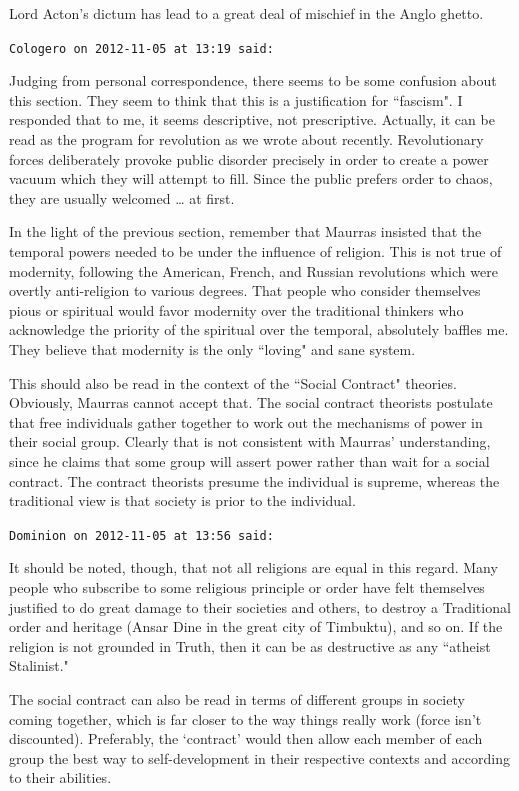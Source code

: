 \begin{footnotesize}
\begin{sffamily}
Lord Acton's dictum has lead to a great deal of mischief in the Anglo ghetto.


\hfill

\texttt{Cologero on 2012-11-05 at 13:19 said: }

Judging from personal correspondence, there seems to be some confusion about this section. They seem to think that this is a justification for ``fascism". I responded that to me, it seems descriptive, not prescriptive. Actually, it can be read as the program for revolution as we wrote about recently. Revolutionary forces deliberately provoke public disorder precisely in order to create a power vacuum which they will attempt to fill. Since the public prefers order to chaos, they are usually welcomed … at first.

In the light of the previous section, remember that Maurras insisted that the temporal powers needed to be under the influence of religion. This is not true of modernity, following the American, French, and Russian revolutions which were overtly anti-religion to various degrees. That people who consider themselves pious or spiritual would favor modernity over the traditional thinkers who acknowledge the priority of the spiritual over the temporal, absolutely baffles me. They believe that modernity is the only ``loving" and sane system.

This should also be read in the context of the ``Social Contract" theories. Obviously, Maurras cannot accept that. The social contract theorists postulate that free individuals gather together to work out the mechanisms of power in their social group. Clearly that is not consistent with Maurras' understanding, since he claims that some group will assert power rather than wait for a social contract. The contract theorists presume the individual is supreme, whereas the traditional view is that society is prior to the individual.


\hfill

\texttt{Dominion on 2012-11-05 at 13:56 said: }

It should be noted, though, that not all religions are equal in this regard. Many people who subscribe to some religious principle or order have felt themselves justified to do great damage to their societies and others, to destroy a Traditional order and heritage (Ansar Dine in the great city of Timbuktu), and so on. If the religion is not grounded in Truth, then it can be as destructive as any ``atheist Stalinist."

The social contract can also be read in terms of different groups in society coming together, which is far closer to the way things really work (force isn't discounted). Preferably, the `contract' would then allow each member of each group the best way to self-development in their respective contexts and according to their abilities.

\hfill

\end{sffamily}\end{footnotesize}
